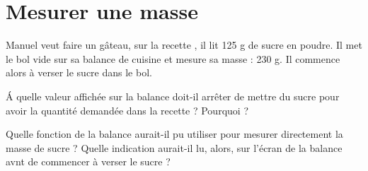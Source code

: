 \documentclass[a4paper,11pt]{exam}
\begin{document}
\newpage

\section{Mesurer une masse}

Manuel veut faire un gâteau, sur la recette , il lit 125 g de sucre en poudre. Il met le bol vide sur sa balance de cuisine et mesure sa masse : 230 g. Il commence alors à verser le sucre dans le bol.
\begin{questions}

	\question \'A quelle valeur affichée sur la balance doit-il arrêter de mettre du sucre pour avoir la quantité demandée dans la recette ? Pourquoi ?
	
	\fillwithdottedlines{4cm}

	\question Quelle fonction de la balance aurait-il pu utiliser pour mesurer directement la masse de sucre ? Quelle indication aurait-il lu, alors, sur l'écran de la balance avnt de commencer à verser le sucre ?
	
		\fillwithdottedlines{4cm}
\end{questions}
\ \label{LastPage}
\end{document}
